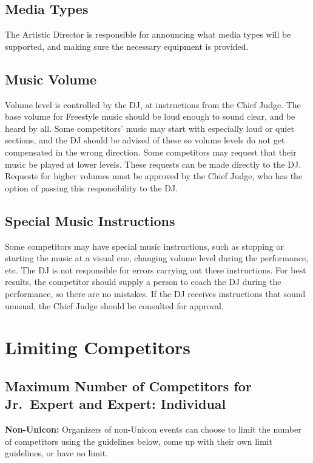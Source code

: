\subsection{Media Types}
The Artistic Director is responsible for announcing what media types will be supported, and making sure the necessary equipment is provided.

\subsection{Music Volume} %
Volume level is controlled by the DJ, at instructions from the Chief Judge.
The base volume for Freestyle music should be loud enough to sound clear, and be heard by all.
Some competitors' music may start with especially loud or quiet sections, and the DJ should be advised of these so volume levels do not get compensated in the wrong direction.
Some competitors may request that their music be played at lower levels.
These requests can be made directly to the DJ.
Requests for higher volumes must be approved by the Chief Judge, who has the option of passing this responsibility to the DJ.

\subsection{Special Music Instructions}
Some competitors may have special music instructions, such as stopping or starting the music at a visual cue, changing volume level during the performance, etc.
The DJ is not responsible for errors carrying out these instructions.
For best results, the competitor should supply a person to coach the DJ during the performance, so there are no mistakes.
If the DJ receives instructions that sound unusual, the Chief Judge should be consulted for approval.

\section{Limiting Competitors}

\subsection{Maximum Number of Competitors for Jr.~Expert and Expert: Individual}
\textbf{Non-Unicon:} Organizers of non-Unicon events can choose to limit the number of competitors using the guidelines below, come up with their own limit guidelines, or have no limit.

